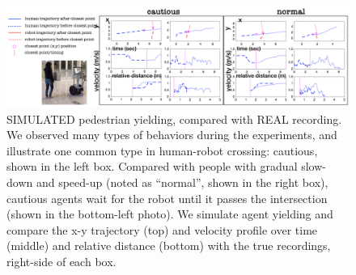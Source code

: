 \documentclass[letterpaper, 10 pt, conference]{ieeeconf}  %
\begin{document}
   \begin{figure}[t]
      \vspace{-1em}
      \centering
      \hspace{-5em}
      \vspace{-1em}
      \includegraphics[scale=0.48]{iros_exp}
      \hspace{-5em}
      \caption{SIMULATED pedestrian yielding, compared with REAL recording. 
      We observed many types of behaviors during the experiments, and 
      illustrate one common type in human-robot crossing: cautious, shown in 
      the left box. Compared with people with 
      gradual slow-down and speed-up (noted as ``normal'', shown in the right 
      box), cautious agents 
      wait for the robot until it passes the intersection (shown in the 
      bottom-left photo). We simulate agent yielding and compare the x-y 
      trajectory (top) and velocity profile over time (middle) and relative 
      distance (bottom) with the true recordings, right-side of each box.   
      }
      \vspace{-1.7em}
     \label{fig:cautious_recording}
   \end{figure}
\end{document}
